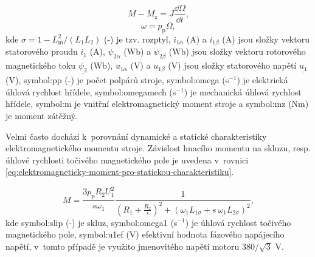\documentclass[a4paper, twoside, 11pt]{article}
\begin{document}
\begin{equation}
    M - M_\text{z} = J \frac{\dd{\Omega}}{\dd{t}},
\end{equation}
\begin{equation}
    \omega = p_\text{p} \Omega,
\end{equation}
kde $\sigma = 1 - L_\text{m}^{2}/(L_1 L_2)$ (-) je tzv. rozptyl, $i_{1\alpha}$ (A) a $i_{1\beta}$ (A) jsou složky vektoru statorového proudu $\underline{i_1}$ (A), $\psi_{2\alpha}$ (Wb) a $\psi_{2\beta}$ (Wb) jsou složky vektoru rotorového magnetického toku $\underline{\psi_2}$ (Wb), $u_{1\alpha}$ (V) a $u_{1\beta}$ (V) jsou složky statorového napětí $\underline{u_1}$ (V), \gls{symbol:pp} (-) je počet polpárů stroje, \gls{symbol:omega} (s$^{-1}$) je elektrická úhlová rychlost hřídele, \gls{symbol:omegamech} (s$^{-1}$) je mechanická úhlová rychlost hřídele, \gls{symbol:m} je vnitřní elektromagnetický moment stroje a \gls{symbol:mz} (Nm) je moment zátěžný.\par

Velmi často dochází k~porovnání dynamické a statické charakteristiky elektromagnetického momentu stroje. Závislost hnacího momentu na skluzu, resp. úhlové rychlosti točivého magnetického pole je uvedena v~rovnici \ref{eq:elektromagneticky-moment-pro-statickou-charakteristiku}.

 \begin{equation}\label{eq:elektromagneticky-moment-pro-statickou-charakteristiku}
            M = \frac{3 p_\text{p} R_2 U_\text{1}^{2}}{s \omega_1} \frac{1}{(R_1 + \frac{R_2}{s})^{2} + (\omega_1 L_{1\sigma} + s~\omega_1 L_{2\sigma})^{2}},
        \end{equation}
        kde \gls{symbol:slip} (-) je skluz, \gls{symbol:omega1} (s$^{-1}$) je úhlová rychlost točivého magnetického pole, \gls{symbol:u1ef} (V) efektivní hodnota fázového napájecího napětí, v~tomto případě je využito jmenovitého napětí motoru $380/\sqrt{3}$ V.
\end{document}
